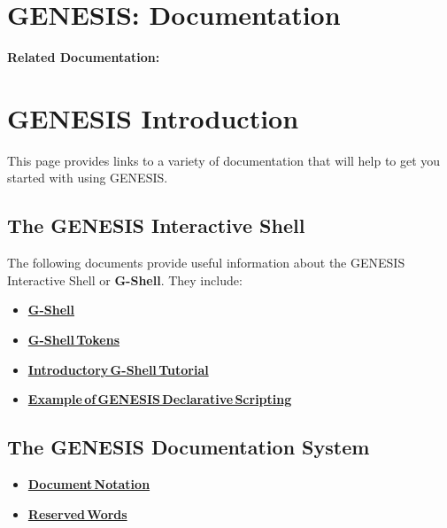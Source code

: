 \documentclass[12pt]{article}
\begin{document}
\section*{GENESIS: Documentation}

{\bf Related Documentation:}

\section*{GENESIS Introduction}

This page provides links to a variety of documentation that will help to get you started with using GENESIS.

\subsection*{The GENESIS Interactive Shell}

The following documents provide useful information about the GENESIS Interactive Shell or {\bf G-Shell}. They include:

\begin{itemize}
\item \href{../gshell/gshell.tex}{\bf G-Shell}
\item \href{../shell-tokens/shell-tokens.tex}{\bf G-Shell\,Tokens}
\item \href{../tutorial1/tutorial1.tex}{\bf Introductory\,G-Shell\,Tutorial}
\item \href{../example-script1/example-script1.tex}{\bf Example\,of\,GENESIS\,Declarative\,Scripting}
\end{itemize}

\subsection*{The GENESIS Documentation System}
\begin{itemize}
\item \href{../document-notation/document-notation.tex}{\bf Document\,Notation}
\item \href{../reserved-words/reserverd-words.tex}{\bf Reserved\,Words}
\end{itemize}
\end{document}
